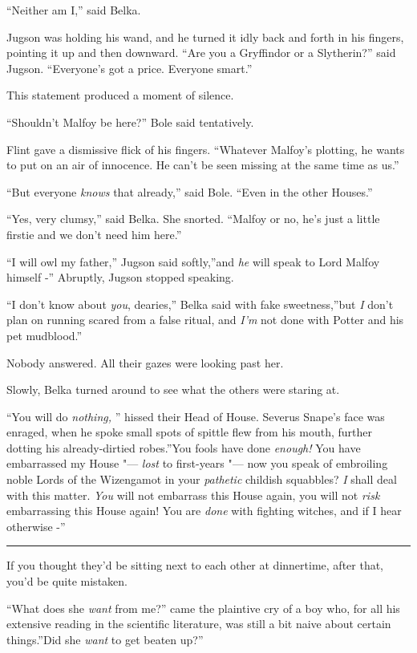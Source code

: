 ``Neither am I,'' said Belka.

Jugson was holding his wand, and he turned it idly back and forth in his
fingers, pointing it up and then downward. ``Are you a Gryffindor or a
Slytherin?'' said Jugson. ``Everyone's got a price. Everyone smart.''

This statement produced a moment of silence.

``Shouldn't Malfoy be here?'' Bole said tentatively.

Flint gave a dismissive flick of his fingers. ``Whatever Malfoy's
plotting, he wants to put on an air of innocence. He can't be seen
missing at the same time as us.''

``But everyone \emph{knows} that already,'' said Bole. ``Even in the
other Houses.''

``Yes, very clumsy,'' said Belka. She snorted. ``Malfoy or no, he's just
a little firstie and we don't need him here.''

``I will owl my father,'' Jugson said softly,''and \emph{he} will speak
to Lord Malfoy himself -'' Abruptly, Jugson stopped speaking.

``I don't know about \emph{you}, dearies,'' Belka said with fake
sweetness,''but \emph{I} don't plan on running scared from a false
ritual, and \emph{I'm} not done with Potter and his pet mudblood.''

Nobody answered. All their gazes were looking past her.

Slowly, Belka turned around to see what the others were staring at.

``You will do \emph{nothing,} '' hissed their Head of House. Severus
Snape's face was enraged, when he spoke small spots of spittle flew from
his mouth, further dotting his already-dirtied robes.''You fools have
done \emph{enough!} You have embarrassed my House "--- \emph{lost} to
first-years "--- now you speak of embroiling noble Lords of the Wizengamot
in your \emph{pathetic} childish squabbles? \emph{I} shall deal with
this matter. \emph{You} will not embarrass this House again, you will
not \emph{risk} embarrassing this House again! You are \emph{done} with
fighting witches, and if I hear otherwise -''

\begin{center}\rule{3in}{0.4pt}\end{center}

If you thought they'd be sitting next to each other at dinnertime, after
that, you'd be quite mistaken.

``What does she \emph{want} from me?'' came the plaintive cry of a boy
who, for all his extensive reading in the scientific literature, was
still a bit naive about certain things.''Did she \emph{want} to get
beaten up?''


